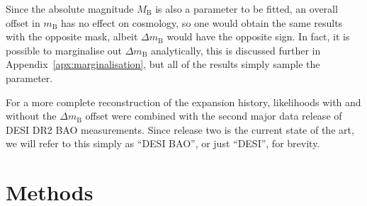 \documentclass[fleqn,usenatbib]{mnras}
\newcommand{\dmb}{\ensuremath{\Delta m_\mathrm B}}
\begin{document}
    Since the absolute magnitude $M_\mathrm B$ is also a parameter to be fitted, an overall offset in $m_\mathrm B$ has no effect on cosmology, so one would obtain the same results with the opposite mask, albeit \dmb{} would have the opposite sign.
    In fact, it is possible to marginalise out \dmb{} analytically, this is discussed further in Appendix~\ref{apx:marginalisation}, but all of the results simply sample the parameter.

    For a more complete reconstruction of the expansion history, likelihoods with and without the \dmb{} offset were combined with the second major data release of DESI DR2 BAO measurements.
    Since release two is the current state of the art, we will refer to this simply as ``DESI BAO'', or just ``DESI'', for brevity.

    \section{Methods}\label{sec:methods}
\end{document}
